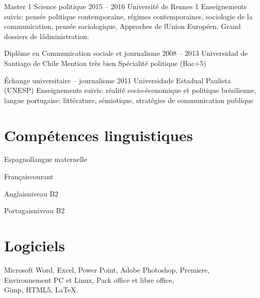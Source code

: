 \documentclass{tccv}
\begin{document}
\begin{yearlist}

\item[Master 1 Science politique]{2015 -- 2016}
     {Université de Rennes 1}
     {Enseignements suivis: pensée politique contemporaine, régimes contemporaines, sociologie de la communication, pensée sociologique, Approches de lUnion Européen, Grand dossiers de l\' administration.}


  

\item[Diplôme en Communication sociale et journalisme]{2008 -- 2013}
     {Universidad de Santiago de Chile}
     {Mention très bien
      Spécialité politique
      (Bac+5)}
   
     
\item[Échange universitaire -- journalisme]{2011}
     {Universidade Estadual Paulista (UNESP)}
     {Enseignements suivis: réalité socio-économique et politique brésilienne, langue portugaise: littérature, sémiotique, stratégies de communication publique}


\end{yearlist}



\section{Compétences linguistiques}

\begin{factlist}
\item{Espagnol}{langue maternelle}	
\item{Français}{courant}	
\item{Anglais}{niveau B2}	
\item{Portugais}{niveau B2}
\end{factlist}

\section{Logiciels}

\begin{factlist}

\item{}{Microsoft Word, Excel, Power Point, Adobe Photoshop, Premiere, \\
Environnement PC et Linux,
Pack office et libre office, \\
Gimp,
HTML5,
\LaTeX.
}


\end{factlist}
\end{document}
